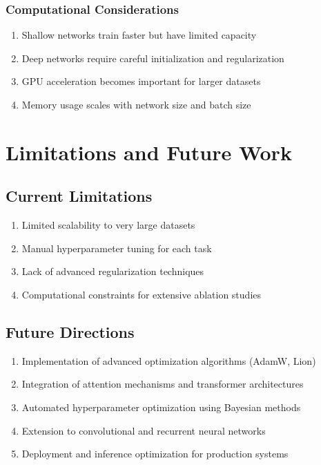\documentclass[conference]{IEEEtran}
\begin{document}
\subsubsection{Computational Considerations}
\begin{enumerate}
    \item Shallow networks train faster but have limited capacity
    \item Deep networks require careful initialization and regularization
    \item GPU acceleration becomes important for larger datasets
    \item Memory usage scales with network size and batch size
\end{enumerate}

\section{Limitations and Future Work}\label{sec:limitations}

\subsection{Current Limitations}
\begin{enumerate}
    \item Limited scalability to very large datasets
    \item Manual hyperparameter tuning for each task
    \item Lack of advanced regularization techniques
    \item Computational constraints for extensive ablation studies
\end{enumerate}

\subsection{Future Directions}
\begin{enumerate}
    \item Implementation of advanced optimization algorithms (AdamW, Lion)
    \item Integration of attention mechanisms and transformer architectures
    \item Automated hyperparameter optimization using Bayesian methods
    \item Extension to convolutional and recurrent neural networks
    \item Deployment and inference optimization for production systems
\end{enumerate}
\end{document}
